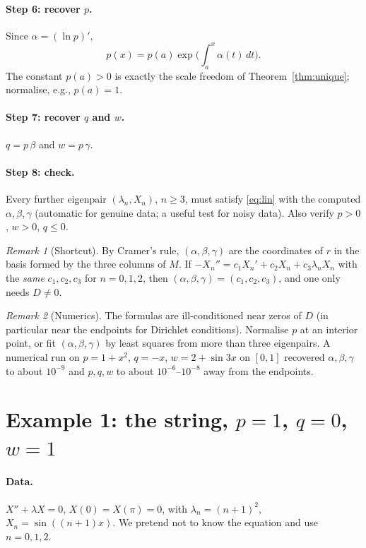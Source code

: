\documentclass[11pt]{article}
\theoremstyle{remark}
\newtheorem*{remark}{Remark}
\begin{document}
\paragraph{Step 6: recover $p$.}
Since $\alpha=(\ln p)'$,
\[
  p(x)=p(a)\exp\Big(\int_a^x\alpha(t)\,dt\Big).
\]
The constant $p(a)>0$ is exactly the scale freedom of Theorem~\ref{thm:unique};
normalise, e.g., $p(a)=1$.

\paragraph{Step 7: recover $q$ and $w$.}
$q=p\,\beta$ and $w=p\,\gamma$.

\paragraph{Step 8: check.}
Every further eigenpair $(\lambda_n,X_n)$, $n\ge3$, must satisfy
\eqref{eq:lin} with the computed $\alpha,\beta,\gamma$ (automatic for genuine
data; a useful test for noisy data). Also verify $p>0$, $w>0$, $q\le0$.

\begin{remark}[Shortcut]
By Cramer's rule, $(\alpha,\beta,\gamma)$ are the coordinates of $r$ in the
basis formed by the three columns of $M$. If $-X_n''=c_1X_n'+c_2X_n+c_3\lambda_nX_n$
with the \emph{same} $c_1,c_2,c_3$ for $n=0,1,2$, then
$(\alpha,\beta,\gamma)=(c_1,c_2,c_3)$, and one only needs $D\ne0$.
\end{remark}

\begin{remark}[Numerics]
The formulas are ill-conditioned near zeros of $D$ (in particular near the
endpoints for Dirichlet conditions). Normalise $p$ at an interior point, or
fit $(\alpha,\beta,\gamma)$ by least squares from more than three eigenpairs.
A numerical run on $p=1+x^2$, $q=-x$, $w=2+\sin3x$ on $[0,1]$ recovered
$\alpha,\beta,\gamma$ to about $10^{-9}$ and $p,q,w$ to about
$10^{-6}$--$10^{-8}$ away from the endpoints.
\end{remark}

\section{Example 1: the string, $p=1$, $q=0$, $w=1$}

\paragraph{Data.} $X''+\lambda X=0$, $X(0)=X(\pi)=0$, with
$\lambda_n=(n+1)^2$, $X_n=\sin((n+1)x)$. We pretend not to know the equation
and use $n=0,1,2$.
\end{document}
